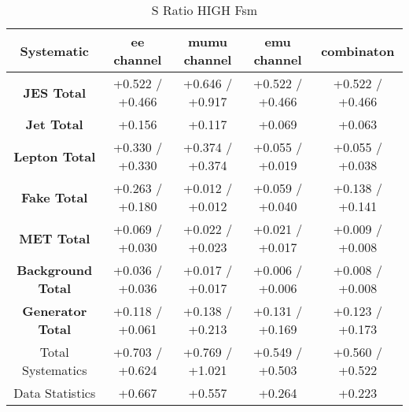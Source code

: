 \begin{table}[htbp]
\scriptsize
  \begin{center} 
  \begin{tabular}{|c|c|c|c|c|}
  \hline
   Systematic                            &  ee channel&  mumu channel&  emu channel&  combinaton\\
 \hline
\textbf{JES Total}                    &+0.522   / +0.466   & +0.646   / +0.917   & +0.522   / +0.466   & +0.522   / +0.466  \\
\textbf{Jet Total}                    &+0.156              & +0.117              & +0.069              & +0.063             \\
\textbf{Lepton Total}                 &+0.330   / +0.330   & +0.374   / +0.374   & +0.055   / +0.019   & +0.055   / +0.038  \\
\textbf{Fake Total}                   &+0.263   / +0.180   & +0.012   / +0.012   & +0.059   / +0.040   & +0.138   / +0.141  \\
\textbf{MET Total}                    &+0.069   / +0.030   & +0.022   / +0.023   & +0.021   / +0.017   & +0.009   / +0.008  \\
\textbf{Background Total}             &+0.036   / +0.036   & +0.017   / +0.017   & +0.006   / +0.006   & +0.008   / +0.008  \\
\textbf{Generator Total}              &+0.118   / +0.061   & +0.138   / +0.213   & +0.131   / +0.169   & +0.123   / +0.173  \\
  \hline
  \hline
Total Systematics                     &+0.703   / +0.624   & +0.769   / +1.021   & +0.549   / +0.503   & +0.560   / +0.522  \\
Data Statistics                       &+0.667              & +0.557              & +0.264              & +0.223             \\
  \hline
  \end{tabular}
  \end{center} 
  \label{tab:fsm_nominal_sratio_high}
  \caption{S Ratio HIGH Fsm}
\end{table}

